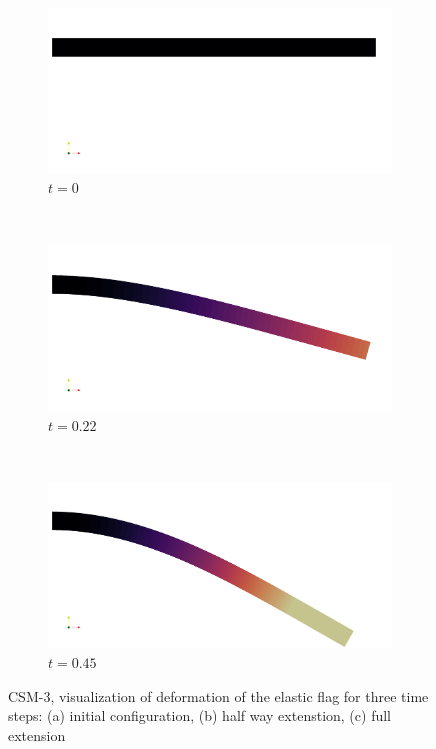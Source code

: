 \newpage
\begin{figure}
    \centering
    \begin{subfigure}[b]{0.3\textwidth}
        \includegraphics[width=\textwidth]{./Fig/csm3_1.png}
       \caption{$t = 0$}
        \label{fig:gull}
    \end{subfigure}
    ~ %
    \begin{subfigure}[b]{0.3\textwidth}
        \includegraphics[width=\textwidth]{./Fig/csm3_2.png}
               \caption{$t = 0.22$}
        \label{fig:tiger}
    \end{subfigure}
    ~ %
    \begin{subfigure}[b]{0.3\textwidth}
        \includegraphics[width=\textwidth]{./Fig/csm3_3.png}
        \caption{$t = 0.45$}
        \label{fig:mouse}
    \end{subfigure}
    \caption{CSM-3, visualization of deformation of the elastic flag for three time steps: (a) initial configuration, (b) half way extenstion, (c) full extension }\label{fig:animals}
\end{figure}

